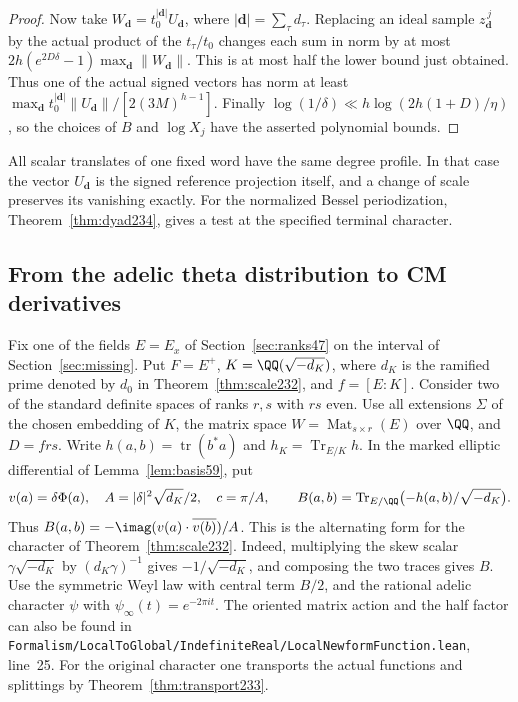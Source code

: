 \documentclass[a4paper,11pt]{article}
\theoremstyle{definition}
\theoremstyle{remark}
\newcommand{\srcloc}[2]{{\small\nolinkurl{#1.lean}}, line~#2}
\numberwithin{equation}{section}
\begin{document}
\begin{proof}
Now take \(W_{\mathbf d}=t_0^{|\mathbf d|}U_{\mathbf d}\), where
\(|\mathbf d|=\sum_\tau d_\tau\). Replacing an ideal sample
\(z_{\mathbf d}^{\,j}\) by the actual product of the \(t_\tau/t_0\)
changes each sum in norm by at most
\(2h(e^{2D\delta}-1)\max_{\mathbf d}\|W_{\mathbf d}\|\).
This is at most half the lower bound just obtained. Thus one
of the actual signed vectors has norm at least
\(\max_{\mathbf d}t_0^{|\mathbf d|}\|U_{\mathbf d}\|/
[2(3M)^{h-1}]\). Finally \(\log(1/\delta)\ll
h\log(2h(1+D)/\eta)\), so the choices of \(B\) and
\(\log X_j\) have the asserted polynomial bounds.
\end{proof}

All scalar translates of one fixed word have the same degree
profile. In that case the vector \(U_{\mathbf d}\) is the signed
reference projection itself, and a change of scale preserves its
vanishing exactly. For the normalized Bessel periodization,
Theorem~\ref{thm:dyad234}, gives a test at the
specified terminal character.

\subsection{From the adelic theta distribution to CM derivatives}\label{nav:V-29}
Fix one of the fields \(E=E_x\) of Section~\ref{sec:ranks47} on the
interval of Section~\ref{sec:missing}. Put \(F=E^+\),
\(K=\QQ(\sqrt{-d_K})\), where \(d_K\) is the ramified prime denoted
by \(d_0\) in Theorem~\ref{thm:scale232}, and \(f=[E:K]\).
Consider two of the standard definite spaces of ranks \(r,s\) with
\(rs\) even. Use all extensions \(\Sigma\) of the chosen embedding
of \(K\), the matrix space \(W=\operatorname{Mat}_{s\times r}(E)\)
over \(\QQ\), and \(D=frs\). Write \(h(a,b)=\operatorname{tr}(b^*a)\)
and \(h_K=\operatorname{Tr}_{E/K}h\). In the marked elliptic
differential of Lemma~\ref{lem:basis59}, put
\[
 v(a)=\delta\Phi(a),\quad A=|\delta|^2\sqrt{d_K}/2,\quad
 c=\pi/A,\qquad B(a,b)=\operatorname{Tr}_{E/\QQ}
                         \bigl(-h(a,b)/\sqrt{-d_K}\bigr).
\]
Thus \(B(a,b)=-\imag(v(a)\cdot\overline{v(b)})/A\).
This is the alternating form for the character of
Theorem~\ref{thm:scale232}. Indeed, multiplying the skew scalar
\(\gamma\sqrt{-d_K}\) by \((d_K\gamma)^{-1}\) gives
\(-1/\sqrt{-d_K}\), and composing the two traces gives \(B\).
Use the symmetric Weyl law with central term \(B/2\), and the
rational adelic character \(\psi\) with \(\psi_\infty(t)=e^{-2\pi it}\).
The oriented matrix action and the half factor can also be found in
\srcloc{Formalism/LocalToGlobal/IndefiniteReal/LocalNewformFunction}{25}.
For the original character one transports the actual functions and
splittings by Theorem~\ref{thm:transport233}.
\end{document}
